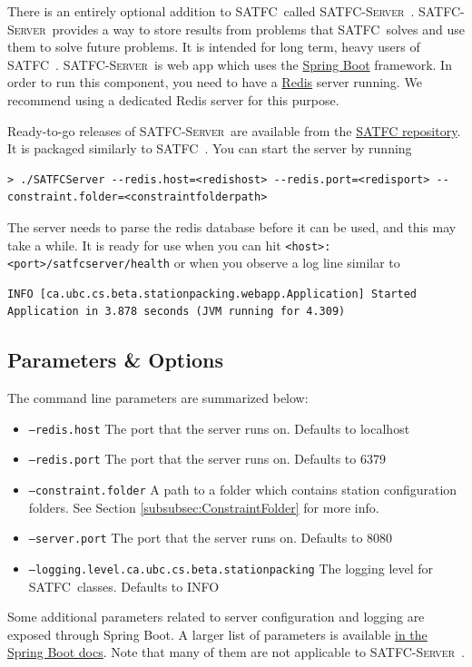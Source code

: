 \documentclass[
10pt, %
letterpaper, %
oneside, %
headinclude,footinclude, %
BCOR5mm, %
needspace, %
]{scrartcl}
\newcommand{\SATFC}{\textsc{SATFC}~}
\newcommand{\SATFCServer}{\textsc{SATFC-Server}~}
\begin{document}
There is an entirely optional addition to \SATFC called \SATFCServer. \SATFCServer provides a way to store results from problems that \SATFC solves and use them to solve future problems. It is intended for long term, heavy users of \SATFC. \SATFCServer is web app which uses the \href{http://projects.spring.io/spring-boot/}{Spring Boot} framework. In order to run this component, you need to have a \href{http://redis.io/}{Redis} server running. We recommend using a dedicated Redis server for this purpose.

Ready-to-go releases of \SATFCServer are available from the \href{https://github.com/FCC/SATFC/releases}{SATFC  repository}. It is packaged similarly to \SATFC. You can start the server by running
\begin{lstlisting}[style=Bash]
> ./SATFCServer --redis.host=<redishost> --redis.port=<redisport> --constraint.folder=<constraintfolderpath>
\end{lstlisting}
The server needs to parse the redis database before it can be used, and this may take a while. It is ready for use when you can hit \texttt{<host>:<port>/satfcserver/health} or when you observe a log line similar to
\begin{lstlisting}[style=Bash]
INFO [ca.ubc.cs.beta.stationpacking.webapp.Application] Started Application in 3.878 seconds (JVM running for 4.309)
\end{lstlisting}

\subsection{Parameters \& Options}

The command line parameters are summarized below:
\begin{itemize}
    \item \texttt{---redis.host} The port that the server runs on. Defaults to localhost
    \item \texttt{---redis.port} The port that the server runs on. Defaults to 6379
    \item \texttt{---constraint.folder} A path to a folder which contains station configuration folders. See Section \ref{subsubsec:ConstraintFolder} for more info.
    \item \texttt{---server.port} The port that the server runs on. Defaults to 8080
    \item \texttt{---logging.level.ca.ubc.cs.beta.stationpacking} The logging level for \SATFC classes. Defaults to INFO
\end{itemize}
Some additional parameters related to server configuration and logging are exposed through Spring Boot. A larger list of parameters is available \href{http://docs.spring.io/spring-boot/docs/current/reference/html/common-application-properties.html}{in the Spring Boot docs}. Note that many of them are not applicable to \SATFCServer.
\end{document}

